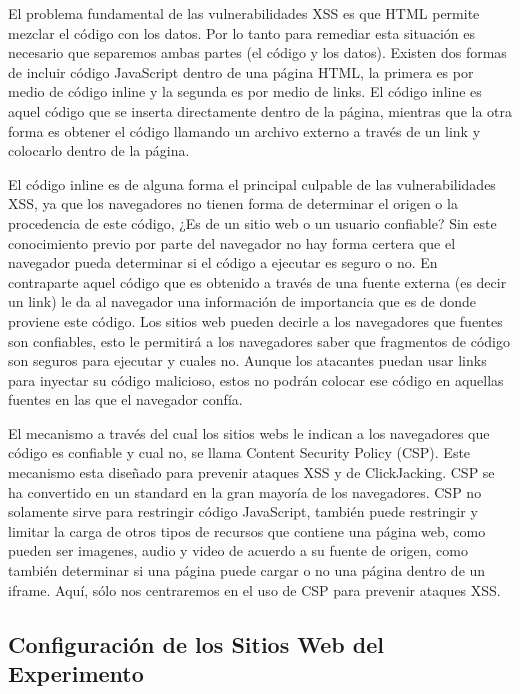 El problema fundamental de las vulnerabilidades XSS es que HTML permite mezclar el código con los datos. Por lo tanto para remediar esta situación es necesario que separemos ambas partes (el código y los datos). Existen dos formas de incluir código JavaScript dentro de una página HTML, la primera es por medio de código inline y la segunda es por medio de links.
El código inline es aquel código que se inserta directamente dentro de la página, mientras que la otra forma es obtener el código llamando un archivo externo a través de un link y colocarlo dentro de la página.

El código inline es de alguna forma el principal culpable de las vulnerabilidades XSS, ya que los navegadores no tienen forma de determinar el origen o la procedencia de este código, ¿Es de un sitio web o un usuario confiable? Sin este conocimiento previo por parte del navegador no hay forma certera que el navegador pueda determinar si el código a ejecutar es seguro o no.
En contraparte aquel código que es obtenido a través de una fuente externa (es decir un link) le da al navegador una información de importancia que es de donde proviene este código. Los sitios web pueden decirle a los navegadores que fuentes son confiables, esto le permitirá a los navegadores saber que fragmentos de código son seguros para ejecutar y cuales no. Aunque los atacantes puedan usar links para inyectar su código malicioso, estos no podrán colocar ese código en aquellas fuentes en las que el navegador confía.

El mecanismo a través del cual los sitios webs le indican a los navegadores que código es confiable y cual no, se llama Content Security Policy (CSP). 
Este mecanismo esta diseñado para prevenir ataques XSS y de ClickJacking.
CSP se ha convertido en un standard en la gran mayoría de los navegadores.
CSP no solamente sirve para restringir código JavaScript, también puede restringir y limitar la carga de otros tipos de recursos que contiene una página web, como pueden ser imagenes, audio y video de acuerdo a su fuente de origen, como también determinar si una página puede cargar o no una página dentro de un iframe. Aquí, sólo nos centraremos en el uso de CSP para prevenir ataques XSS.



\subsection{Configuración de los Sitios Web del Experimento} 

